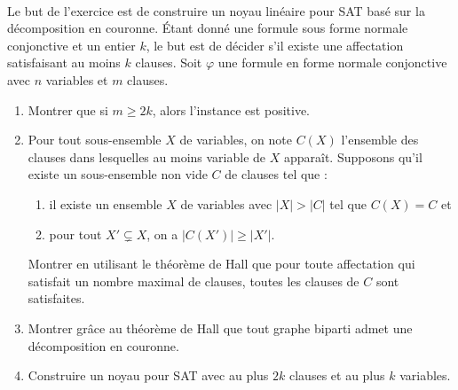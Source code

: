 \begin{td-exo}\,\\
    Le but de l'exercice est de construire un noyau lin\'eaire pour SAT bas\'e sur la d\'ecomposition en couronne.
    \'Etant donn\'e une formule sous forme normale conjonctive et un entier \(k\), le but est de d\'ecider s'il existe une affectation satisfaisant au moins \(k\) clauses.
    Soit \(\varphi\) une formule en forme normale conjonctive avec \(n\) variables et \(m\) clauses.
    \begin{enumerate}
        \item Montrer que si \(m\geq 2k\), alors l'instance est positive.
        
        \item Pour tout sous-ensemble \(X\) de variables, on note \(C(X)\) l'ensemble des clauses dans lesquelles au moins variable de \(X\) appara\^it.
        Supposons qu'il existe un sous-ensemble non vide \(C\) de clauses tel que :
        \begin{enumerate}
            \item il existe un ensemble \(X\) de variables avec \(|X| > |C|\) tel que \(C(X) = C\) et
            \item pour tout \(X' \subsetneq X\), on a \(|C(X')| \geq |X'|\).
        \end{enumerate}
        Montrer en utilisant le th\'eor\`eme de Hall que pour toute affectation qui satisfait un nombre maximal de clauses, toutes les clauses de \(C\) sont satisfaites.

        \item Montrer gr\^ace au th\'eor\`eme de Hall que tout graphe biparti admet une d\'ecomposition en couronne.

        \item Construire un noyau pour SAT avec au plus \(2k\) clauses et au plus \(k\) variables.
    \end{enumerate}
\end{td-exo}

